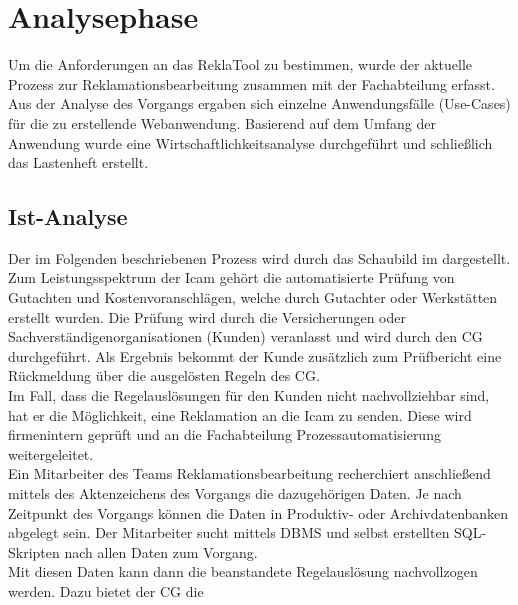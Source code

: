 \section{Analysephase} 
\label{sec:Analysephase}
Um die Anforderungen an das ReklaTool zu bestimmen, wurde der aktuelle Prozess zur Reklamationsbearbeitung
zusammen mit der Fachabteilung erfasst. Aus der Analyse des Vorgangs ergaben sich
einzelne Anwendungsfälle (Use-Cases) für die zu erstellende Webanwendung.
Basierend auf dem Umfang der Anwendung wurde eine Wirtschaftlichkeitsanalyse durchgeführt und
schließlich das Lastenheft erstellt.

\subsection{Ist-Analyse} 
\label{sec:IstAnalyse}
Der im Folgenden beschriebenen Prozess wird durch das Schaubild im  dargestellt.\\
Zum Leistungsspektrum der \acs{Icam} gehört die automatisierte Prüfung von Gutachten und
Kostenvoranschlägen, welche durch Gutachter oder Werkstätten erstellt wurden.
Die Prüfung wird durch die Versicherungen oder Sachverständigenorganisationen (Kunden) veranlasst
und wird durch den \acs{CG} durchgeführt.
Als Ergebnis bekommt der Kunde zusätzlich zum Prüfbericht eine Rückmeldung über die ausgelösten Regeln des \acs{CG}.\\
Im Fall, dass die Regelauslösungen für den Kunden nicht nachvollziehbar sind, hat er die
Möglichkeit, eine Reklamation an die \acs{Icam} zu senden. Diese wird firmenintern geprüft
und an die Fachabteilung Prozessautomatisierung weitergeleitet.\\
Ein Mitarbeiter des Teams Reklamationsbearbeitung recherchiert anschließend mittels des Aktenzeichens
des Vorgangs die dazugehörigen Daten. Je nach Zeitpunkt des Vorgangs können die Daten in Produktiv- oder Archivdatenbanken 
abgelegt sein. Der Mitarbeiter sucht mittels \ac{DBMS} und selbst 
erstellten SQL-Skripten nach allen Daten zum Vorgang.\\
Mit diesen Daten kann dann die beanstandete Regelauslösung nachvollzogen werden. Dazu bietet der \acs{CG} die 
